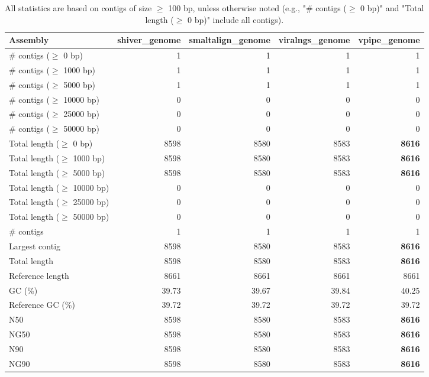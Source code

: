 \documentclass[12pt,a4paper]{article}
\begin{document}
\begin{table}[ht]
\begin{center}
\caption{All statistics are based on contigs of size $\geq$ 100 bp, unless otherwise noted (e.g., "\# contigs ($\geq$ 0 bp)" and "Total length ($\geq$ 0 bp)" include all contigs).}
\begin{tabular}{|l*{4}{|r}|}
\hline
Assembly & shiver\_genome & smaltalign\_genome & viralngs\_genome & vpipe\_genome \\ \hline
\# contigs ($\geq$ 0 bp) & 1 & 1 & 1 & 1 \\ \hline
\# contigs ($\geq$ 1000 bp) & 1 & 1 & 1 & 1 \\ \hline
\# contigs ($\geq$ 5000 bp) & 1 & 1 & 1 & 1 \\ \hline
\# contigs ($\geq$ 10000 bp) & 0 & 0 & 0 & 0 \\ \hline
\# contigs ($\geq$ 25000 bp) & 0 & 0 & 0 & 0 \\ \hline
\# contigs ($\geq$ 50000 bp) & 0 & 0 & 0 & 0 \\ \hline
Total length ($\geq$ 0 bp) & 8598 & 8580 & 8583 & {\bf 8616} \\ \hline
Total length ($\geq$ 1000 bp) & 8598 & 8580 & 8583 & {\bf 8616} \\ \hline
Total length ($\geq$ 5000 bp) & 8598 & 8580 & 8583 & {\bf 8616} \\ \hline
Total length ($\geq$ 10000 bp) & 0 & 0 & 0 & 0 \\ \hline
Total length ($\geq$ 25000 bp) & 0 & 0 & 0 & 0 \\ \hline
Total length ($\geq$ 50000 bp) & 0 & 0 & 0 & 0 \\ \hline
\# contigs & 1 & 1 & 1 & 1 \\ \hline
Largest contig & 8598 & 8580 & 8583 & {\bf 8616} \\ \hline
Total length & 8598 & 8580 & 8583 & {\bf 8616} \\ \hline
Reference length & 8661 & 8661 & 8661 & 8661 \\ \hline
GC (\%) & 39.73 & 39.67 & 39.84 & 40.25 \\ \hline
Reference GC (\%) & 39.72 & 39.72 & 39.72 & 39.72 \\ \hline
N50 & 8598 & 8580 & 8583 & {\bf 8616} \\ \hline
NG50 & 8598 & 8580 & 8583 & {\bf 8616} \\ \hline
N90 & 8598 & 8580 & 8583 & {\bf 8616} \\ \hline
NG90 & 8598 & 8580 & 8583 & {\bf 8616} \\ \hline

\end{tabular}
\end{center}
\end{table}
\end{document}
